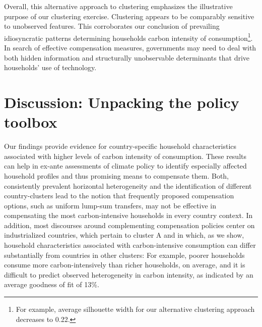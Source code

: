 \documentclass[12pt, a4paper]{article}
\begin{document}
Overall, this alternative approach to clustering emphasizes the illustrative purpose of our clustering exercise. Clustering appears to be comparably sensitive to unobserved features. This corroborates our conclusion of prevailing idiosyncratic patterns determining households carbon intensity of consumption\footnote{For example, average silhouette width for our alternative clustering approach decreases to 0.22.}. In search of effective compensation measures, governments may need to deal with both hidden information and structurally unobservable determinants that drive households' use of technology.

\section{Discussion: Unpacking the policy toolbox} \label{sec:discussion}

Our findings provide evidence for country-specific household characteristics associated with higher levels of carbon intensity of consumption. These results can help in ex-ante assessments of climate policy to identify especially affected household profiles and thus promising means to compensate them. Both, consistently prevalent horizontal heterogeneity and the identification of different country-clusters lead to the notion that frequently proposed compensation options, such as uniform lump-sum transfers, may not be effective in compensating the most carbon-intensive households in every country context. In addition, most discourses around complementing compensation policies center on industrialized countries, which pertain to cluster A and in which, as we show, household characteristics associated with carbon-intensive consumption can differ substantially from countries in other clusters: For example, poorer households consume more carbon-intensively than richer households, on average, and it is difficult to predict observed heterogeneity in carbon intensity, as indicated by an average goodness of fit of 13\%.
\end{document}
